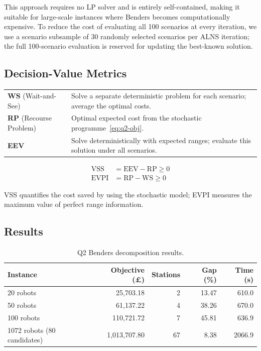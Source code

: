 \documentclass[11pt,a4paper]{article}
\begin{document}
\noindent
This approach requires no LP solver and is entirely self-contained, making it suitable for large-scale instances where Benders becomes computationally expensive.
To reduce the cost of evaluating all 100 scenarios at every iteration, we use a scenario subsample of 30 randomly selected scenarios per ALNS iteration; the full 100-scenario evaluation is reserved for updating the best-known solution.


\subsection{Decision-Value Metrics}
\label{sec:vss-evpi}

\begin{tabular}{@{}lp{10cm}@{}}
\textbf{WS} (Wait-and-See) & Solve a separate deterministic problem for each scenario; average the optimal costs. \\[4pt]
\textbf{RP} (Recourse Problem) & Optimal expected cost from the stochastic programme~\eqref{eq:q2-obj}. \\[4pt]
\textbf{EEV} & Solve deterministically with expected ranges; evaluate this solution under all scenarios.
\end{tabular}

\medskip
\begin{align}
  \text{VSS} &= \text{EEV} - \text{RP} \geq 0 \label{eq:vss} \\
  \text{EVPI} &= \text{RP} - \text{WS} \geq 0 \label{eq:evpi}
\end{align}

\noindent
VSS quantifies the cost saved by using the stochastic model; EVPI measures the maximum value of perfect range information.


\subsection{Results}

\begin{table}[H]
\centering
\caption{Q2 Benders decomposition results.}
\label{tab:q2-benders}
\begin{tabular}{lrrrr}
\toprule
Instance & Objective (\pounds) & Stations & Gap (\%) & Time (s) \\
\midrule
20 robots  & 25,703.18 & 2 & 13.47 & 610.0 \\
50 robots  & 61,137.22 & 4 & 38.26 & 670.0 \\
100 robots & 110,721.72 & 7 & 45.81 & 636.9 \\
1072 robots (80 candidates) & 1,013,707.80 & 67 & 8.38 & 2066.9 \\
\bottomrule
\end{tabular}
\end{table}
\end{document}
